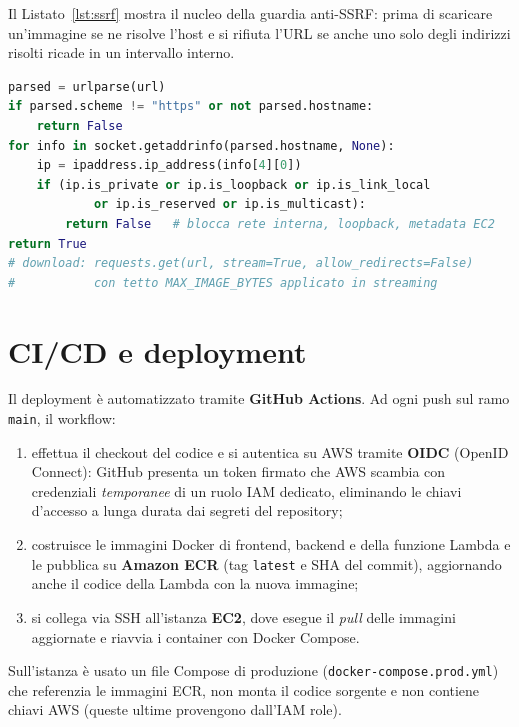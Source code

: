 \documentclass[11pt,a4paper]{article}
\begin{document}
Il Listato~\ref{lst:ssrf} mostra il nucleo della guardia anti-SSRF: prima di scaricare
un'immagine se ne risolve l'host e si rifiuta l'URL se anche uno solo degli indirizzi
risolti ricade in un intervallo interno.

\begin{lstlisting}[language=Python,caption={Nucleo della guardia anti-SSRF sul download delle immagini.},label={lst:ssrf}]
parsed = urlparse(url)
if parsed.scheme != "https" or not parsed.hostname:
    return False
for info in socket.getaddrinfo(parsed.hostname, None):
    ip = ipaddress.ip_address(info[4][0])
    if (ip.is_private or ip.is_loopback or ip.is_link_local
            or ip.is_reserved or ip.is_multicast):
        return False   # blocca rete interna, loopback, metadata EC2
return True
# download: requests.get(url, stream=True, allow_redirects=False)
#           con tetto MAX_IMAGE_BYTES applicato in streaming
\end{lstlisting}

\section{CI/CD e deployment}
Il deployment è automatizzato tramite \textbf{GitHub Actions}. Ad ogni push sul ramo
\texttt{main}, il workflow:
\begin{enumerate}[nosep]
  \item effettua il checkout del codice e si autentica su AWS tramite \textbf{OIDC}
        (OpenID Connect): GitHub presenta un token firmato che AWS scambia con
        credenziali \emph{temporanee} di un ruolo IAM dedicato, eliminando le chiavi
        d'accesso a lunga durata dai segreti del repository;
  \item costruisce le immagini Docker di frontend, backend e della funzione Lambda e le
        pubblica su \textbf{Amazon ECR} (tag \texttt{latest} e SHA del commit),
        aggiornando anche il codice della Lambda con la nuova immagine;
  \item si collega via SSH all'istanza \textbf{EC2}, dove esegue il \emph{pull} delle
        immagini aggiornate e riavvia i container con Docker Compose.
\end{enumerate}
Sull'istanza è usato un file Compose di produzione (\texttt{docker-compose.prod.yml})
che referenzia le immagini ECR, non monta il codice sorgente e non contiene chiavi
AWS (queste ultime provengono dall'IAM role).
\end{document}
